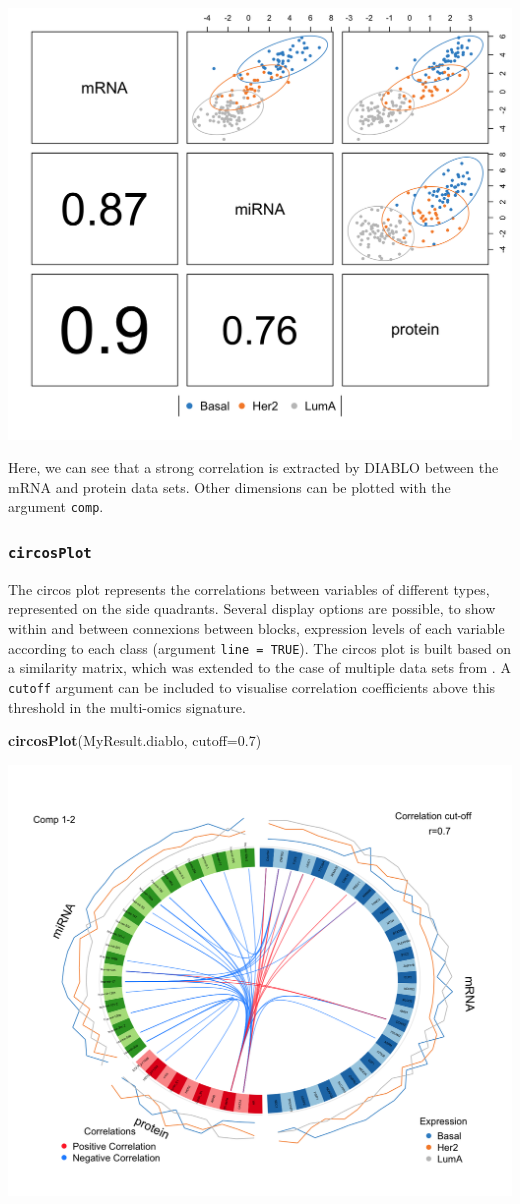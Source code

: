 \documentclass[]{book}
\newenvironment{Shaded}{\begin{snugshade}}{\end{snugshade}}
\newcommand{\KeywordTok}[1]{\textcolor[rgb]{0.13,0.29,0.53}{\textbf{#1}}}
\newcommand{\DataTypeTok}[1]{\textcolor[rgb]{0.13,0.29,0.53}{#1}}
\newcommand{\FloatTok}[1]{\textcolor[rgb]{0.00,0.00,0.81}{#1}}
\newcommand{\NormalTok}[1]{#1}
\theoremstyle{definition}
\theoremstyle{definition}
\theoremstyle{definition}
\theoremstyle{remark}
\begin{document}
\begin{center}\includegraphics[width=0.5\linewidth]{Figures/unnamed-chunk-6-1} \end{center}

Here, we can see that a strong correlation is extracted by DIABLO
between the mRNA and protein data sets. Other dimensions can be plotted
with the argument \texttt{comp}.

\subsubsection{\texorpdfstring{\texttt{circosPlot}}{circosPlot}}\label{circosplot}

The circos plot represents the correlations between variables of
different types, represented on the side quadrants. Several display
options are possible, to show within and between connexions between
blocks, expression levels of each variable according to each class
(argument \texttt{line\ =\ TRUE}). The circos plot is built based on a
similarity matrix, which was extended to the case of multiple data sets
from \citep{Gon12}. A \texttt{cutoff} argument can be included to
visualise correlation coefficients above this threshold in the
multi-omics signature.

\begin{Shaded}
\begin{Highlighting}[]
\KeywordTok{circosPlot}\NormalTok{(MyResult.diablo, }\DataTypeTok{cutoff=}\FloatTok{0.7}\NormalTok{)}
\end{Highlighting}
\end{Shaded}

\begin{center}\includegraphics[width=0.5\linewidth]{Figures/unnamed-chunk-7-1} \end{center}
\end{document}
